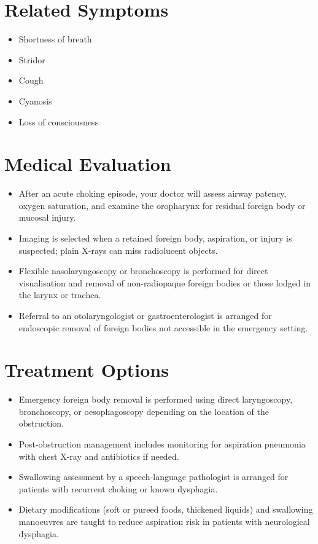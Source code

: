 \section*{Related Symptoms}
\begin{itemize}
  \item Shortness of breath
  \item Stridor
  \item Cough
  \item Cyanosis
  \item Loss of consciousness
\end{itemize}

\section*{Medical Evaluation}
\begin{itemize}
  \item After an acute choking episode, your doctor will assess airway patency, oxygen saturation, and examine the oropharynx for residual foreign body or mucosal injury.
   \item Imaging is selected when a retained foreign body, aspiration, or injury is suspected; plain X-rays can miss radiolucent objects.
  \item Flexible nasolaryngoscopy or bronchoscopy is performed for direct visualisation and removal of non-radiopaque foreign bodies or those lodged in the larynx or trachea.
  \item Referral to an otolaryngologist or gastroenterologist is arranged for endoscopic removal of foreign bodies not accessible in the emergency setting.
\end{itemize}

\section*{Treatment Options}
\begin{itemize}
  \item Emergency foreign body removal is performed using direct laryngoscopy, bronchoscopy, or oesophagoscopy depending on the location of the obstruction.
  \item Post-obstruction management includes monitoring for aspiration pneumonia with chest X-ray and antibiotics if needed.
  \item Swallowing assessment by a speech-language pathologist is arranged for patients with recurrent choking or known dysphagia.
  \item Dietary modifications (soft or pureed foods, thickened liquids) and swallowing manoeuvres are taught to reduce aspiration risk in patients with neurological dysphagia.
\end{itemize}

